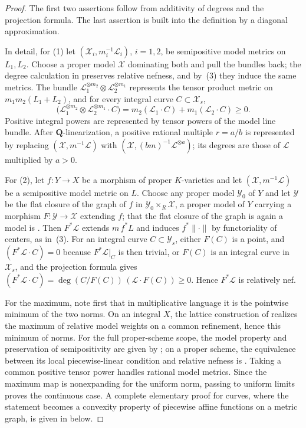 \begin{proof}
The first two assertions follow from additivity of degrees and the projection
formula. The last assertion is built into the definition by a diagonal
approximation.

In detail, for (1) let $(\mathcal X_i,m_i^{-1}\mathcal L_i)$, $i=1,2$,
be semipositive model metrics on $L_1,L_2$. Choose a proper model
$\mathcal X$ dominating both and pull the bundles back; the degree
calculation in  preserves relative nefness, and by
\,(3) they induce the same metrics. The
bundle $\mathcal L_1^{\otimes m_2}\otimes\mathcal L_2^{\otimes m_1}$
represents the tensor product metric on $m_1m_2(L_1+L_2)$, and for every
integral curve $C\subset\mathcal X_s$,
\[
 \bigl(\mathcal L_1^{\otimes m_2}\otimes\mathcal L_2^{\otimes m_1}\cdot C\bigr)
 =m_2(\mathcal L_1\cdot C)+m_1(\mathcal L_2\cdot C)\ge0 .
\]
Positive integral powers are represented by tensor powers of the model line
bundle. After $\mathbf Q$-linearization, a positive rational multiple
$r=a/b$ is represented by replacing
$(\mathcal X,m^{-1}\mathcal L)$ with $(\mathcal X,(bm)^{-1}
\mathcal L^{\otimes a})$; its degrees are those of $\mathcal L$
multiplied by $a>0$.

For (2), let $f:Y\to X$ be a morphism of proper $K$-varieties and let
$(\mathcal X,m^{-1}\mathcal L)$ be a semipositive model metric on $L$.
Choose any proper model $\mathcal Y_0$ of $Y$ and let $\mathcal Y$ be
the flat closure of the graph of $f$ in
$\mathcal Y_0\times_R\mathcal X$, a proper model of $Y$ carrying a
morphism $F:\mathcal Y\to\mathcal X$ extending $f$; that the flat
closure of the graph is again a model is
. Then
$F^*\mathcal L$ extends $m\,f^*L$ and induces $f^*\|\cdot\|$ by
functoriality of centers, as in
\,(3). For an integral curve
$C\subset\mathcal Y_s$, either $F(C)$ is a point, and
$(F^*\mathcal L\cdot C)=0$ because $F^*\mathcal L|_C$ is then trivial,
or $F(C)$ is an integral curve in $\mathcal X_s$, and the projection
formula gives
$(F^*\mathcal L\cdot C)=\deg(C/F(C))\,(\mathcal L\cdot F(C))\ge0$. Hence
$F^*\mathcal L$ is relatively nef.

For the maximum, note first that in multiplicative language it is the
pointwise minimum of the two norms. On an integral $X$, the lattice
construction of  realizes the maximum of
relative model weights on a common refinement, hence this minimum of
norms. For the full proper-scheme scope, the model property and preservation of
semipositivity are given by \cite[Proposition~3.12]{GM19}; on a proper scheme,
the equivalence between its local piecewise-linear condition and relative
nefness is \cite[Theorem~1.1]{GM19}. Taking a common positive tensor power
handles rational model metrics. Since the maximum map is nonexpanding for
the uniform norm, passing to uniform limits proves the continuous case. A
complete elementary proof for curves, where the statement becomes a
convexity property of piecewise affine functions on a metric graph, is given
in  below.


\end{proof}
